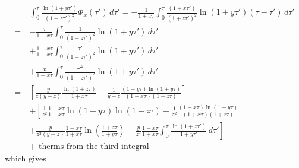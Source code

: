 \documentclass[11pt]{article}
\begin{document}
\begin{align}
    \quad& \int_0^{\tau} \frac{\ln(1+y\tau')}{(1+z\tau')^2} \Phi_x(\tau') \,d\tau' 
    = -\frac{1}{1+x\tau} \int_0^{\tau} \frac{(1+x\tau')}{(1+z\tau')^2} \ln(1+y\tau')(\tau-\tau') \,d\tau' \\\nonumber
    =& -\frac{\tau}{1+x\tau}\int_0^{\tau} \frac{1}{(1+z\tau')^2} \ln(1+y\tau')\,d\tau' \\\nonumber
    &+ \frac{1-x\tau}{1+x\tau}\int_0^{\tau} \frac{\tau'}{(1+z\tau')^2} \ln(1+y\tau')\,d\tau' \\\nonumber
    &+ \frac{x}{1+x\tau}\int_0^{\tau} \frac{\tau'^2}{(1+z\tau')^2} \ln(1+y\tau')\,d\tau' \\\nonumber
    =&{} \left[\frac{y}{z(y-z)}\frac{\ln(1+z\tau)}{1+x\tau} - \frac{1}{y-z}\frac{(1+y\tau)\ln(1+y\tau)}{(1+x\tau)(1+z\tau)}\right] \\\nonumber
    &+ \left[\frac{1}{z^2}\frac{1-x\tau}{1+x\tau}\ln(1+y\tau)\ln(1+z\tau) + \frac{1}{z^2}\frac{(1-x\tau)\ln(1+y\tau)}{(1+x\tau)(1+z\tau)} \right. \\\nonumber
    &+ \left. \frac{y}{z^2(y-z)}\frac{1-x\tau}{1+x\tau}\ln\left(\frac{1+z\tau}{1+y\tau}\right)-\frac{y}{z^2}\frac{1-x\tau}{1+x\tau}\int_0^{\tau}\frac{\ln(1+z\tau')}{1+y\tau'} \,d\tau' \right] \\\nonumber
    &+\textrm{ therms from the third integral}
\end{align}
which gives
\end{document}
